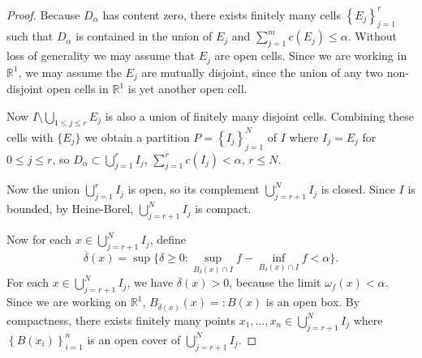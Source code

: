 \begin{proof}

	Because $D_\alpha$ has content zero, there exists finitely many cells $\left\{ E_j \right\}_{j = 1}^{r} $ such that $D_\alpha$ is contained in the union of $E_j$ and $ \sum_{j=1}^{m} c(E_j) \le \alpha $. 
	Without loss of generality we may assume that $E_j$ are open cells. Since we are working in $\mathbb{R}^1$, we may assume the $E_j$ are mutually disjoint, since the union of any two non-disjoint open cells in $\mathbb{R}^1$ is yet another open cell.



	Now $I \setminus \bigcup_{1\le j \le r} E_j$ is also a union of finitely many disjoint cells. Combining these cells with $\{E_j\} $ we obtain a partition $P = \left\{ I_j \right\}_{j = 1}^N $ of $I$ where  $I_j = E_j$ for  $0\le j\le r$, so $D_\alpha \subset \bigcup_{j = 1}^r I_j$, $\sum_{j=1}^{r} c(I_j) < \alpha $, $r \le N$.

	Now the union $\bigcup_{j = 1} ^r I_j$ is open, so its complement $\bigcup_{j = r+1} ^N I_j$ is closed. Since $I$ is bounded, by Heine-Borel,  $\bigcup_{j = r+1} ^N I_j$ is compact.

	Now for each $x \in \bigcup_{j = r+1} ^N I_j$, define
	\[
		\overline{\delta} (x) = 
		\sup \{\delta\ge 0 : \sup _{B_\delta(x) \cap I} f - \inf _{B_\delta(x) \cap I}f < \alpha\} 
	.\] 
	For each $x \in \bigcup_{j = r+1} ^N I_j$, we have $\overline{\delta} (x) > 0$, because the limit $\omega_f(x) < \alpha$. Since we are working on $\mathbb{R}^1$, $B_{\overline{\delta}(x)} (x) =: B(x)$ is an open box. By compactness, there exists finitely many points $x_1, \ldots, x_n \in \bigcup_{j = r+1} ^N I_j$ where $\left\{B(x_i)\right\}_{i = 1}^n $ is an open cover of $\bigcup_{j = r+1} ^N I_j$.


\end{proof}
